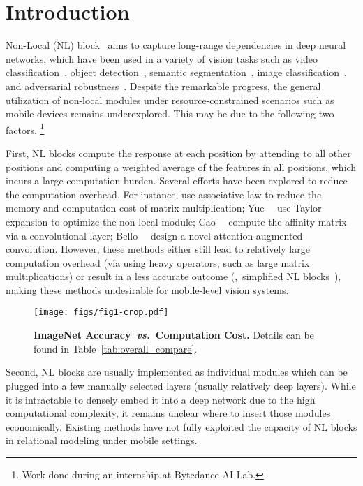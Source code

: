 \documentclass[10pt,twocolumn,letterpaper]{article}
\begin{document}
\section{Introduction} \label{sec:intro}
Non-Local (NL) block~\cite{bello2019attention, wang2018non} aims to capture long-range dependencies in deep neural networks, which have been used in a variety of vision tasks such as video classification~\cite{wang2018non}, object detection~\cite{wang2018non}, semantic segmentation~\cite{zhao2018psanet,zhou2019multi}, image classification~\cite{bello2019attention}, and adversarial robustness~\cite{xie2019feature}. Despite the remarkable progress, the general utilization of non-local modules under resource-constrained scenarios such as mobile devices remains underexplored. This may be due to the following two factors. \let\thefootnote\relax\footnote{Work done during an internship at Bytedance AI Lab.}

First, NL blocks compute the response at each position by attending to all other positions
and computing a weighted average of the features in all positions, which incurs a large computation burden. Several efforts have been explored to reduce the computation overhead. For instance, \cite{chen20182,levi2018efficient} use associative law to reduce the memory and computation cost of matrix multiplication; Yue~\etal~\cite{yue2018compact} use Taylor expansion to optimize the non-local module; Cao~\etal~\cite{cao2019gcnet} compute the affinity matrix via a convolutional layer; Bello~\etal~\cite{bello2019attention} design a novel attention-augmented convolution. 
However, these methods either still lead to relatively large computation overhead (via using heavy operators, such as large matrix multiplications) or result in a less accurate outcome (\eg,~simplified NL blocks~\cite{cao2019gcnet}), making these methods undesirable for mobile-level vision systems. 

\begin{figure}[tb]
\centering
\texttt{[image: figs/fig1-crop.pdf]}
\caption{\textbf{ImageNet Accuracy~\emph{vs.}~Computation Cost.} Details can be found in Table~\ref{tab:overall_compare}.}
\label{fig:main_acc}
\vspace{-1em}
\end{figure}

Second, NL blocks are usually implemented as individual modules which can be plugged into a few manually selected layers (usually relatively deep layers). While it is intractable to densely embed it into a deep network due to the high computational complexity, it remains unclear where to insert those modules economically. Existing methods have not fully exploited the capacity of NL blocks in relational modeling under mobile settings.
\end{document}
